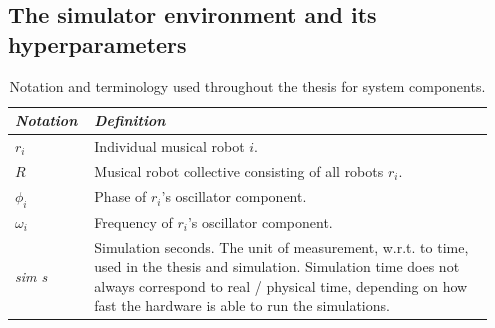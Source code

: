 	\subsection{The simulator environment and its hyperparameters}
	\label{sim_env_and_hyperparams}
	
	\begin{table}[ht]
		\centering
		\begin{tabular}{p{0.15\linewidth} | p{0.8\linewidth}}
		  \textit{\textbf{Notation}}  & \textit{\textbf{Definition}} \\ \hline
		  $r_i$ & Individual musical robot $i$. \\ \hline
		  $R$ & Musical robot collective consisting of all robots $r_i$. \\ \hline
		  $\phi_i$ & Phase of $r_i$'s oscillator component. \\ \hline
		  $\omega_i$ & Frequency of $r_i$'s oscillator component. \\ \hline
		  \textit{sim s} & Simulation seconds. The unit of measurement, w.r.t. to time, used in the thesis and simulation. Simulation time does not always correspond to real / physical time, depending on how fast the hardware is able to run the simulations.
		\end{tabular}
		\caption{Notation and terminology used throughout the thesis for system components.}
		\label{tab:synchrony_simulator_terminology}
	\end{table}
	
